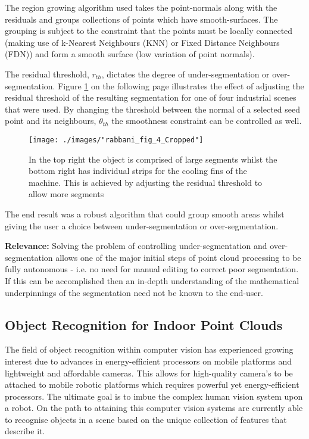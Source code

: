 The region growing algorithm used takes the point-normals along with the residuals and groups collections of points which have smooth-surfaces. The grouping is subject to the constraint that the points must be locally connected (making use of k-Nearest Neighbours (KNN) or Fixed Distance Neighbours (FDN)) and form a smooth surface (low variation of point normals).

The residual threshold, $r_{th}$, dictates the degree of under-segmentation or over-segmentation. Figure \ref{Smoothness_Results} on the following page illustrates the effect of adjusting the residual threshold of the resulting segmentation for one of four industrial scenes that were used. By changing the threshold between the normal of a selected seed point and its neighbours, $\theta_{th}$ the smoothness constraint can be controlled as well. 
\clearpage
\begin{figure}[ht!]
	\centering
	\texttt{[image: ./images/"rabbani\_fig\_4\_Cropped"]}
	\caption[Effect of changing the residual threshold in segmentation]{In the top right the object is comprised of large segments whilst the bottom right has individual strips for the cooling fins of the machine. This is achieved by adjusting the residual threshold to allow more segments \citep{rabbani_segmentation_2006}
		\label{Smoothness_Results}}
\end{figure}

The end result was a robust algorithm that could group smooth areas whilst giving the user a choice between under-segmentation or over-segmentation. 

\textbf{Relevance:} Solving the problem of controlling under-segmentation and over-segmentation allows one of the major initial steps of point cloud processing to be fully autonomous - i.e. no need for manual editing to correct poor segmentation. If this can be accomplished then an in-depth understanding of the mathematical underpinnings of the segmentation need not be known to the end-user.

\subsection{Object Recognition for Indoor Point Clouds}
The field of object recognition within computer vision has experienced growing interest due to advances in energy-efficient processors on mobile platforms and lightweight and affordable cameras. This allows for high-quality camera's to be attached to mobile robotic platforms which requires powerful yet energy-efficient processors. The ultimate goal is to imbue the complex human vision system upon a robot. On the path to attaining this computer vision systems are currently able to recognise objects in a scene based on the unique collection of features that describe it.

